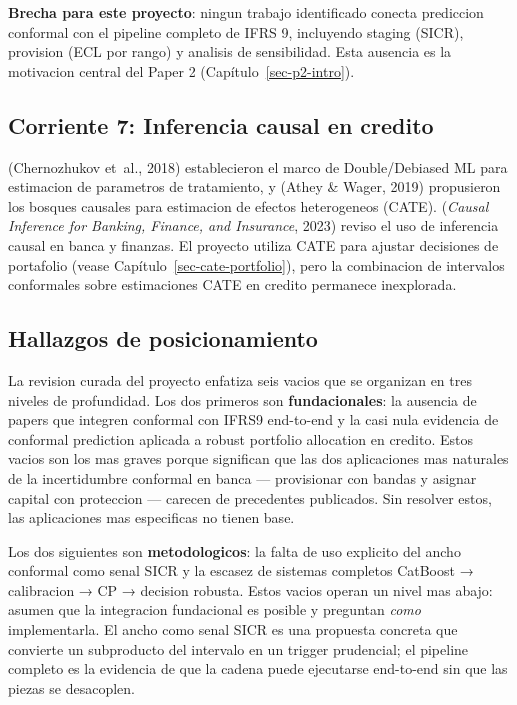 \documentclass[
  spanish,
  11pt,
  letterpaper,
]{scrbook}
\theoremstyle{plain}
\theoremstyle{remark}
\begin{document}
\textbf{Brecha para este proyecto}: ningun trabajo identificado conecta
prediccion conformal con el pipeline completo de IFRS 9, incluyendo
staging (SICR), provision (ECL por rango) y analisis de sensibilidad.
Esta ausencia es la motivacion central del Paper 2
(Capítulo~\ref{sec-p2-intro}).

\subsection{Corriente 7: Inferencia causal en
credito}\label{sec-sota-causal}

({Chernozhukov et~al.}, 2018) establecieron el marco de Double/Debiased
ML para estimacion de parametros de tratamiento, y (Athey \& Wager,
2019) propusieron los bosques causales para estimacion de efectos
heterogeneos (CATE). (\emph{Causal Inference for Banking, Finance, and
Insurance}, 2023) reviso el uso de inferencia causal en banca y
finanzas. El proyecto utiliza CATE para ajustar decisiones de portafolio
(vease Capítulo~\ref{sec-cate-portfolio}), pero la combinacion de
intervalos conformales sobre estimaciones CATE en credito permanece
inexplorada.

\subsection{Hallazgos de posicionamiento}\label{sec-sota-gaps}

La revision curada del proyecto enfatiza seis vacios que se organizan en
tres niveles de profundidad. Los dos primeros son
\textbf{fundacionales}: la ausencia de papers que integren conformal con
IFRS9 end-to-end y la casi nula evidencia de conformal prediction
aplicada a robust portfolio allocation en credito. Estos vacios son los
mas graves porque significan que las dos aplicaciones mas naturales de
la incertidumbre conformal en banca --- provisionar con bandas y asignar
capital con proteccion --- carecen de precedentes publicados. Sin
resolver estos, las aplicaciones mas especificas no tienen base.

Los dos siguientes son \textbf{metodologicos}: la falta de uso explicito
del ancho conformal como senal SICR y la escasez de sistemas completos
CatBoost → calibracion → CP → decision robusta. Estos vacios operan un
nivel mas abajo: asumen que la integracion fundacional es posible y
preguntan \emph{como} implementarla. El ancho como senal SICR es una
propuesta concreta que convierte un subproducto del intervalo en un
trigger prudencial; el pipeline completo es la evidencia de que la
cadena puede ejecutarse end-to-end sin que las piezas se desacoplen.
\end{document}

